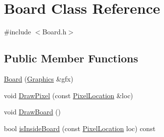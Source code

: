 \hypertarget{class_board}{}\section{Board Class Reference}
\label{class_board}


{\ttfamily \#include $<$Board.\+h$>$}

\subsection*{Public Member Functions}
\begin{DoxyCompactItemize}
\item 
\hyperlink{class_board_a46374cb53089d5abbf7609234dca4828}{Board} (\hyperlink{class_graphics}{Graphics} \&gfx)
\item 
void \hyperlink{class_board_a3bfb1c528ae857f74b9ff3b3ba8d1911}{Draw\+Pixel} (const \hyperlink{class_pixel_location}{Pixel\+Location} \&loc)
\item 
void \hyperlink{class_board_a13216aad741156a095cf4509026a6649}{Draw\+Board} ()
\item 
bool \hyperlink{class_board_af00a708a0b6f2744b4494bd0d5fe0221}{is\+Inside\+Board} (const \hyperlink{class_pixel_location}{Pixel\+Location} loc) const
\end{DoxyCompactItemize}
